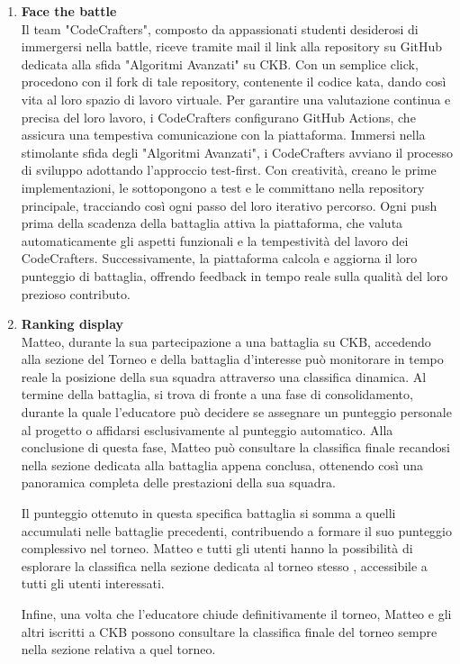 \begin{enumerate}[label=\textbf{\Alph*}.]
\item  \textbf{Face the battle} \\
Il team "CodeCrafters", composto da appassionati studenti desiderosi di immergersi nella battle, riceve tramite mail il link alla repository su GitHub dedicata alla sfida "Algoritmi Avanzati" su CKB. Con un semplice click, procedono con il fork di tale repository, contenente il codice kata, dando così vita al loro spazio di lavoro virtuale. Per garantire una valutazione continua e precisa del loro lavoro, i CodeCrafters configurano GitHub Actions, che assicura una tempestiva comunicazione con la piattaforma.
Immersi nella stimolante sfida degli "Algoritmi Avanzati", i CodeCrafters avviano il processo di sviluppo adottando l'approccio test-first. Con creatività, creano le prime implementazioni, le sottopongono a test e le committano nella repository principale, tracciando così ogni passo del loro iterativo percorso. Ogni push prima della scadenza della battaglia attiva la piattaforma, che valuta automaticamente gli aspetti funzionali e la tempestività del lavoro dei CodeCrafters. Successivamente, la piattaforma calcola e aggiorna il loro punteggio di battaglia, offrendo feedback in tempo reale sulla qualità del loro prezioso contributo.
\item \textbf{Ranking display} \\
Matteo, durante la sua partecipazione a una battaglia su CKB, accedendo alla sezione del Torneo e della battaglia d'interesse può monitorare in tempo reale la posizione della sua squadra attraverso una classifica dinamica. Al termine della battaglia, si trova di fronte a una fase di consolidamento, durante la quale l'educatore può decidere se assegnare un punteggio personale al progetto o affidarsi esclusivamente al punteggio automatico. Alla conclusione di questa fase, Matteo può consultare la classifica finale  recandosi nella sezione dedicata alla battaglia appena conclusa, ottenendo così una panoramica completa delle prestazioni della sua squadra.

Il punteggio ottenuto in questa specifica battaglia si somma a quelli accumulati nelle battaglie precedenti, contribuendo a formare il suo punteggio complessivo nel torneo. Matteo e tutti gli utenti hanno la possibilità di esplorare la classifica nella sezione dedicata al torneo stesso , accessibile a tutti gli utenti interessati.

Infine, una volta che l'educatore chiude definitivamente il torneo, Matteo e gli altri iscritti a CKB possono consultare la classifica finale del torneo sempre nella sezione relativa a quel torneo.


\end{enumerate}
